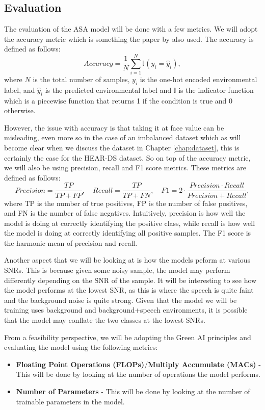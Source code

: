 \documentclass[logo,bsc,singlespacing,parskip,online]{infthesis}
\begin{document}
\subsection{Evaluation}
The evaluation of the ASA model will be done with a few metrics. 
We will adopt the accuracy metric which is something the paper by \citet{Huwel2020HearDS} also used.
The accuracy is defined as follows:
\[
Accuracy = \frac{1}{N} \sum_{i=1}^{N} \mathbb{I}(y_i = \hat{y}_i),
\]
where \(N\) is the total number of samples, \(y_i\) is the one-hot encoded environmental label, and \(\hat{y}_i\) is the predicted environmental label
and \(\mathbb{I}\) is the indicator function which is a piecewise function that returns 1 if the condition is true and 0 otherwise.

However, the issue with accuracy is that taking it 
at face value can be misleading, even more so in the case of an imbalanced dataset 
which as will become clear when we discuss the dataset in Chapter \ref{chap:dataset},
this is certainly the case for the HEAR-DS dataset. 
So on top of the accuracy metric, we will also be using precision, recall and F1 score metrics.
These metrics are defined as follows:
\[
Precision = \frac{TP}{TP + FP}, \quad Recall = \frac{TP}{TP + FN}, \quad F1 = 2 \cdot \frac{Precision \cdot Recall}{Precision + Recall},
\]
where TP is the number of true positives, FP is the number of false positives, and FN is the number of false negatives.
Intuitively, precision is how well the model is doing at correctly identifying the positive class,
while recall is how well the model is doing at correctly identifying all positive samples.
The F1 score is the harmonic mean of precision and recall.

Another aspect that we will be looking at is how the models peform at various SNRs. 
This is because given some noisy sample, the model may perform differently depending on the SNR of the sample.
It will be interesting to see how the model performs at the lowest SNR,
as this is where the speech is quite faint and the background noise is quite strong. 
Given that the model we will be training uses background and background+speech environments,
it is possible that the model may conflate the two classes at the lowest SNRs.


From a feasibility perspective, we will be adopting the Green AI principles \citep{schwartz2019greenai} 
and evaluating the model using the following metrics:
\begin{itemize}
   \item \textbf{Floating Point Operations (FLOPs)}/\textbf{Multiply Accumulate (MACs)} - This will be done by looking at the number of operations the model performs.
   \item \textbf{Number of Parameters} - This will be done by looking at the number of trainable parameters in the model.
\end{itemize}
\end{document}
